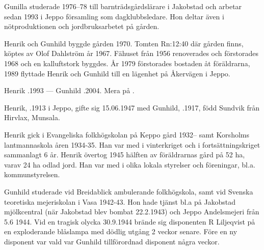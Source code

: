 Gunilla studerade 1976--78 till barnträdsgårdslärare i Jakobstad och arbetar sedan 1993 i Jeppo församling som dagklubbsledare. Hon deltar även i nötproduktionen och jordbruksarbetet på gården.


%
Henrik och Gunhild byggde gården 1970. Tomten Rn:12:40 där gården finns, köptes av Olof Dahlström år 1967. Fähuset från 1956 renoverades och förstorades 1968 och en kalluftstork byggdes. År 1979 förstorades bostaden åt föräldrarna, 1989 flyttade Henrik och Gunhild till en lägenhet på Åkervägen i Jeppo.

Henrik .1993  ---  Gunhild .2004. Mera på .



%



%
Henrik, .1913 i Jeppo, gifte sig 15.06.1947 med Gunhild, .1917, född Sundvik från Hirvlax, Munsala.
\begin{jhchildren}
  \item {}
  \item {}
\end{jhchildren}
Henrik gick i Evangeliska folkhögskolan på Keppo gård 1932-- samt Korsholms lantmannaskola åren 1934-35. Han var med i vinterkriget och i fortsättningskriget sammanlagt 6 år. Henrik övertog 1945 hälften av föräldrarnas gård på 52 ha, varav 24 ha odlad jord. Han var med i olika lokala styrelser och föreningar, bl.a. kommunstyrelsen.

Gunhild studerade vid Breidablick ambulerande folkhögskola, samt vid Svenska teoretiska mejeriskolan i Vasa 1942-43. Hon hade tjänst bl.a på Jakobstad mjölkcentral (när Jakobstad blev bombat 22.2.1943) och Jeppo Andelsmejeri från 5.6 1944. Vid en tragisk olycka 30.9.1944 brände sig disponenten R Liljeqvist på en exploderande blåslampa med dödlig utgång 2 veckor senare. Före en ny disponent var vald var Gunhild tillförordnad disponent några veckor.

